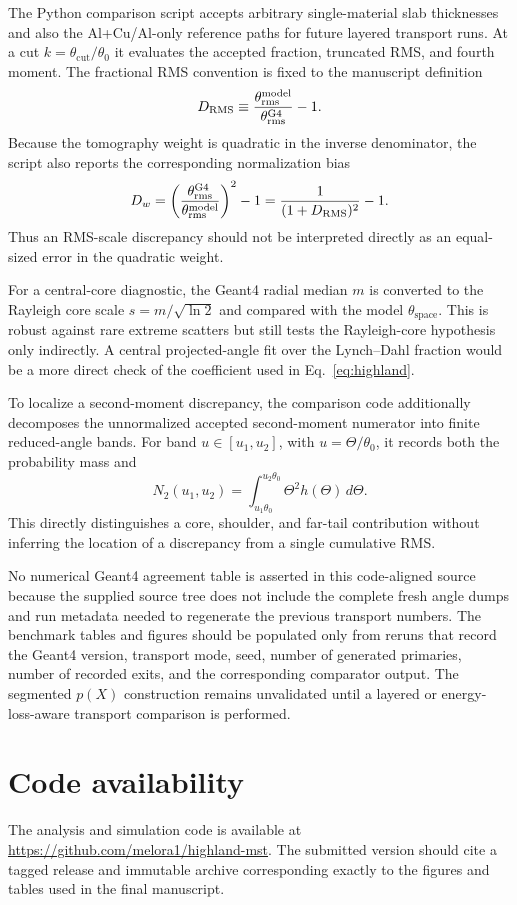 \documentclass[aps,pra,reprint,longbibliography,floatfix]{revtex4-2}
\newcommand{\thetazero}{\ensuremath{\theta_0}}
\newcommand{\thetaspace}{\ensuremath{\theta_{\mathrm{space}}}}
\newcommand{\thetarms}{\ensuremath{\theta_{\mathrm{rms}}}}
\newcommand{\thetacut}{\ensuremath{\theta_{\mathrm{cut}}}}
\begin{document}
The Python comparison script accepts arbitrary single-material slab thicknesses and also the Al+Cu/Al-only reference paths for future layered transport runs.  At a cut $k=\thetacut/\thetazero$ it evaluates the accepted fraction, truncated RMS, and fourth moment.  The fractional RMS convention is fixed to the manuscript definition
\begin{equation}
D_{\rm RMS}\equiv\frac{\thetarms^{\rm model}}{\thetarms^{\rm G4}}-1.
\end{equation}
Because the tomography weight is quadratic in the inverse denominator, the script also reports the corresponding normalization bias
\begin{equation}
D_w=\left(\frac{\thetarms^{\rm G4}}{\thetarms^{\rm model}}\right)^2-1
=\frac{1}{(1+D_{\rm RMS})^2}-1.
\end{equation}
Thus an RMS-scale discrepancy should not be interpreted directly as an equal-sized error in the quadratic weight.

For a central-core diagnostic, the Geant4 radial median $m$ is converted to the Rayleigh core scale $s=m/\sqrt{\ln2}$ and compared with the model $\thetaspace$.  This is robust against rare extreme scatters but still tests the Rayleigh-core hypothesis only indirectly.  A central projected-angle fit over the Lynch--Dahl fraction would be a more direct check of the coefficient used in Eq.~\eqref{eq:highland}.

To localize a second-moment discrepancy, the comparison code additionally decomposes the unnormalized accepted second-moment numerator into finite reduced-angle bands.  For band $u\in[u_1,u_2]$, with $u=\Theta/\thetazero$, it records both the probability mass and
\begin{equation}
N_2(u_1,u_2)=\int_{u_1\thetazero}^{u_2\thetazero}
\Theta^2 h(\Theta)\,d\Theta .
\end{equation}
This directly distinguishes a core, shoulder, and far-tail contribution without inferring the location of a discrepancy from a single cumulative RMS.

No numerical Geant4 agreement table is asserted in this code-aligned source because the supplied source tree does not include the complete fresh angle dumps and run metadata needed to regenerate the previous transport numbers.  The benchmark tables and figures should be populated only from reruns that record the Geant4 version, transport mode, seed, number of generated primaries, number of recorded exits, and the corresponding comparator output.  The segmented $p(X)$ construction remains unvalidated until a layered or energy-loss-aware transport comparison is performed.

\section{Code availability}
The analysis and simulation code is available at \url{https://github.com/melora1/highland-mst}.  The submitted version should cite a tagged release and immutable archive corresponding exactly to the figures and tables used in the final manuscript.



\end{document}
